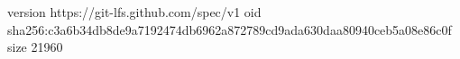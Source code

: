 version https://git-lfs.github.com/spec/v1
oid sha256:c3a6b34db8de9a7192474db6962a872789cd9ada630daa80940ceb5a08e86c0f
size 21960
